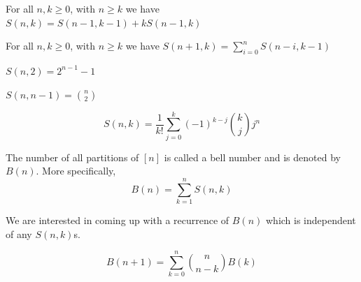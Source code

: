\begin{claim}
For all $n,k\geq 0$, with $n\geq k$ we have $S(n,k)=S(n-1,k-1)+kS(n-1,k)$
\end{claim}
\begin{claim}
For all $n,k\geq 0$, with $n\geq k$ we have $S(n+1,k)=\sum_{i=0}^{n}S(n-i,k-1)$
\end{claim}
\begin{claim}
    $S(n,2)=2^{n-1}-1$
\end{claim}
\begin{claim}
    $S(n,n-1)=\binom{n}{2}$
\end{claim}
\begin{claim}
    \[
    S(n,k) = \dfrac{1}{k!}\sum_{j=0}^{k}(-1)^{k-j}\binom{k}{j}j^n
    \]
\end{claim}

\begin{definition}
The number of all partitions of $[n]$ is called a bell number and is denoted by $B(n)$. More specifically,
\[
B(n) = \sum_{k=1}^nS(n,k)
\]
\end{definition}
We are interested in coming up with a recurrence of $B(n)$ which is independent of any $S(n,k)$s. 
\begin{claim}
    \[
    B(n+1) = \sum_{k=0}^{n}\binom{n}{n-k}B(k)
    \]
\end{claim}
